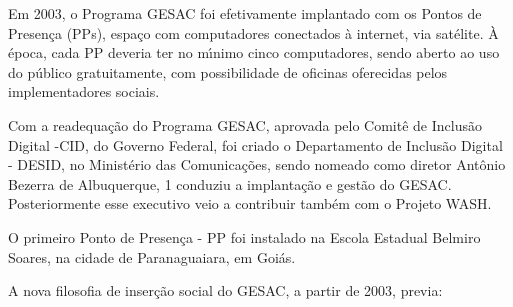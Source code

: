 \documentclass[
12pt,		%
openright,	%
twoside,  %
a4paper,			%
chapter=TITLE,		%
english,			%
french,				%
spanish,			%
brazil				%
]{USPSC-classe/USPSC}
\begin{document}
Em 2003, o Programa GESAC foi efetivamente implantado com os Pontos de Presen\c{c}a (PPs), espa\c{c}o com  computadores conectados \`a internet, via sat\'elite. \`A \'epoca, cada PP deveria ter no m\'{\i}nimo cinco computadores, sendo aberto ao  uso do p\'ublico gratuitamente, com possibilidade de oficinas oferecidas pelos implementadores sociais.










Com a readequa\c{c}\~ao do Programa GESAC, aprovada pelo Comit\^e de Inclus\~ao Digital -CID, do Governo Federal,  foi criado o Departamento de Inclus\~ao Digital - DESID, no Minist\'erio das Comunica\c{c}\~oes, sendo nomeado como diretor Ant\^onio Bezerra de Albuquerque, 1 conduziu a implanta\c{c}\~ao e gest\~ao do GESAC. Posteriormente esse executivo veio a contribuir tamb\'em com o Projeto WASH.










O primeiro Ponto de Presen\c{c}a - PP foi  instalado na  Escola Estadual Belmiro Soares, na cidade de Paranaguaiara, em  Goi\'as.










A nova filosofia  de inser\c{c}\~ao social do GESAC, a partir de 2003, previa:
\end{document}
